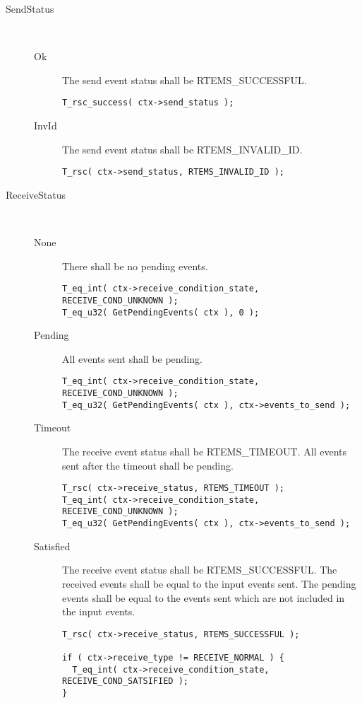\begin{description}
  \item[SendStatus]~
  \begin{description}
  \item[Ok]
    The send event status shall be RTEMS\_SUCCESSFUL.
\begin{verbatim}
T_rsc_success( ctx->send_status );
\end{verbatim}
  \item[InvId]
    The send event status shall be RTEMS\_INVALID\_ID.
\begin{verbatim}
T_rsc( ctx->send_status, RTEMS_INVALID_ID );
\end{verbatim}
  \end{description}

  \item[ReceiveStatus]~
  \begin{description}
  \item[None]
    There shall be no pending events.
\begin{verbatim}
T_eq_int( ctx->receive_condition_state, RECEIVE_COND_UNKNOWN );
T_eq_u32( GetPendingEvents( ctx ), 0 );
\end{verbatim}
  \item[Pending]
    All events sent shall be pending.
\begin{verbatim}
T_eq_int( ctx->receive_condition_state, RECEIVE_COND_UNKNOWN );
T_eq_u32( GetPendingEvents( ctx ), ctx->events_to_send );
\end{verbatim}
  \item[Timeout]
    The receive event status shall be RTEMS\_TIMEOUT.  All events sent after
the timeout shall be pending.
\begin{verbatim}
T_rsc( ctx->receive_status, RTEMS_TIMEOUT );
T_eq_int( ctx->receive_condition_state, RECEIVE_COND_UNKNOWN );
T_eq_u32( GetPendingEvents( ctx ), ctx->events_to_send );
\end{verbatim}
  \item[Satisfied]
    The receive event status shall be RTEMS\_SUCCESSFUL.  The received events
shall be equal to the input events sent.  The pending events shall be
equal to the events sent which are not included in the input events.
\begin{verbatim}
T_rsc( ctx->receive_status, RTEMS_SUCCESSFUL );

if ( ctx->receive_type != RECEIVE_NORMAL ) {
  T_eq_int( ctx->receive_condition_state, RECEIVE_COND_SATSIFIED );
}


\end{verbatim}
\end{description}
\end{description}
